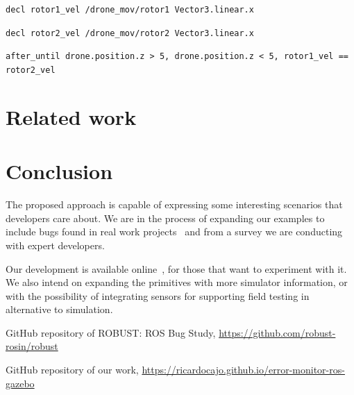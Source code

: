 \documentclass[runningheads]{llncs}
\begin{document}
\texttt{decl rotor1\_vel /drone\_mov/rotor1 Vector3.linear.x}

\texttt{decl rotor2\_vel /drone\_mov/rotor2 Vector3.linear.x}

\vspace{3mm}

\texttt{after\_until drone.position.z > 5, drone.position.z < 5, rotor1\_vel == rotor2\_vel}


\section{Related work}



\section{Conclusion}

The proposed approach is capable of expressing some interesting scenarios that developers care about. We are in the process of expanding our examples to include bugs found in real work projects~\cite{robust_repo} and from a survey we are conducting with expert developers.

Our development is available online~\cite{github_repo}, for those that want to experiment with it. We also intend on expanding the primitives with more simulator information, or with the possibility of integrating sensors for supporting field testing in alternative to simulation.


\begin{thebibliography}{8}


GitHub repository of ROBUST: ROS Bug Study, \url{https://github.com/robust-rosin/robust}

GitHub repository of our work, \url{https://ricardocajo.github.io/error-monitor-ros-gazebo}
\end{thebibliography}
\end{document}
